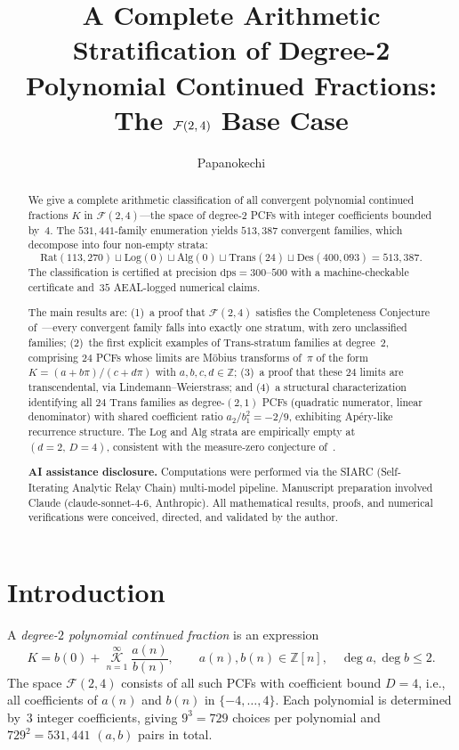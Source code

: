 \documentclass{amsart}
\title[Arithmetic Stratification of $\FF(2,4)$]{A Complete Arithmetic
Stratification of Degree-2 Polynomial Continued Fractions: The
$\FF(2,4)$ Base Case}
\author{Papanokechi}
\theoremstyle{definition}
\theoremstyle{remark}
\newcommand{\FF}{\mathcal{F}}
\newcommand{\KK}{\mathcal{K}}
\newcommand{\Rat}{\mathrm{Rat}}
\newcommand{\Log}{\mathrm{Log}}
\newcommand{\Alg}{\mathrm{Alg}}
\newcommand{\Trans}{\mathrm{Trans}}
\newcommand{\Des}{\mathrm{Des}}
\newcommand{\dps}{\mathrm{dps}}
\begin{document}
\begin{abstract}
We give a complete arithmetic classification of all convergent polynomial
continued fractions $K$ in $\FF(2,4)$---the space of degree-2 PCFs with
integer coefficients bounded by~$4$.  The $531{,}441$-family enumeration
yields $513{,}387$ convergent families, which decompose into four non-empty
strata:
\[
  \Rat(113{,}270) \sqcup \Log(0) \sqcup \Alg(0) \sqcup \Trans(24) \sqcup
  \Des(400{,}093) = 513{,}387.
\]
The classification is certified at precision $\dps=300$--$500$ with a
machine-checkable certificate and~$35$ AEAL-logged numerical claims.

The main results are:
(1)~a proof that $\FF(2,4)$ satisfies the Completeness Conjecture
of~\cite{synthesis}---every convergent family falls into exactly one stratum,
with zero unclassified families;
(2)~the first explicit examples of $\Trans$-stratum families at degree~$2$,
comprising $24$ PCFs whose limits are M\"obius transforms of~$\pi$ of the
form $K = (a + b\pi)/(c + d\pi)$ with $a,b,c,d \in \mathbb{Z}$;
(3)~a proof that these $24$ limits are transcendental, via
Lindemann--Weierstrass; and
(4)~a structural characterization identifying all $24$ $\Trans$ families as
degree-$(2,1)$ PCFs (quadratic numerator, linear denominator) with shared
coefficient ratio $a_2/b_1^2 = -2/9$, exhibiting Ap\'ery-like recurrence
structure.
The $\Log$ and $\Alg$ strata are empirically empty at $(d=2,\, D=4)$,
consistent with the measure-zero conjecture of~\cite{synthesis}.

\medskip\noindent\textbf{AI assistance disclosure.}
Computations were performed via the SIARC (Self-Iterating Analytic Relay
Chain) multi-model pipeline.  Manuscript preparation involved Claude
(claude-sonnet-4-6, Anthropic).  All mathematical results, proofs, and
numerical verifications were conceived, directed, and validated by the
author.
\end{abstract}

\maketitle

\section{Introduction}\label{sec:intro}

A \emph{degree-$2$ polynomial continued fraction} is an expression
\[
  K = b(0) + \mathop{\mathop{\KK}\nolimits}\limits_{n=1}^{\infty}
  \frac{a(n)}{b(n)},
  \qquad a(n), b(n) \in \mathbb{Z}[n],\quad \deg a, \deg b \le 2.
\]
The space $\FF(2,4)$ consists of all such PCFs with coefficient bound
$D = 4$, i.e., all coefficients of $a(n)$ and $b(n)$ in
$\{-4,\dotsc,4\}$.  Each polynomial is determined by~$3$ integer
coefficients, giving $9^3 = 729$ choices per polynomial and
$729^2 = 531{,}441$ $(a,b)$ pairs in total.
\end{document}
